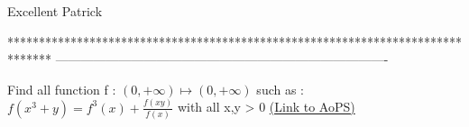 \begin{solution}
	Excellent Patrick
\end{solution}
*******************************************************************************
-------------------------------------------------------------------------------

\begin{problem}
	Find all function f : $(0,+\infty ) \mapsto (0,+\infty)$ such as :
$f(x^{3}+y)=f^{3}(x)+\frac{f(xy)}{f(x)}$ with all x,y > 0
	\flushright \href{https://artofproblemsolving.com/community/c6h557587}{(Link to AoPS)}
\end{problem}



